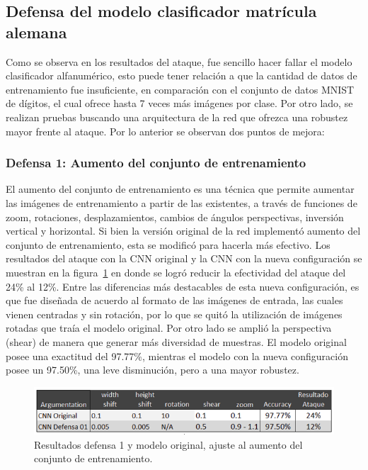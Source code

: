 \subsection{Defensa del modelo clasificador matrícula alemana}

Como se observa en los resultados del ataque, fue sencillo hacer fallar el modelo clasificador alfanumérico, esto puede tener relación a que la cantidad de datos de entrenamiento fue insuficiente, en comparación con el conjunto de datos MNIST de dígitos, el cual ofrece hasta 7 veces más imágenes por clase. Por otro lado, se realizan pruebas buscando una arquitectura de la red que ofrezca una robustez mayor frente al ataque. Por lo anterior se observan dos puntos de mejora:



\subsubsection{Defensa 1: Aumento del conjunto de entrenamiento}

El aumento del conjunto de entrenamiento es una técnica que permite aumentar las imágenes de entrenamiento a partir de las existentes, a través de funciones de zoom, rotaciones, desplazamientos, cambios de ángulos perspectivas, inversión vertical y horizontal. Si bien la versión original de la red implementó aumento del conjunto de entrenamiento, esta se modificó para hacerla más efectivo. Los resultados del ataque con la CNN original y la CNN con la nueva configuración se muestran en la figura~\ref{fig:63} en donde se logró reducir la efectividad del ataque del 24\% al 12\%. Entre las diferencias más destacables de esta nueva configuración, es que fue diseñada de acuerdo al formato de las imágenes de entrada, las cuales vienen centradas y sin rotación, por lo que se quitó la utilización de imágenes rotadas que traía el modelo original. Por otro lado se amplió la perspectiva (shear) de manera que generar más diversidad de muestras. El modelo original posee una exactitud del 97.77\%, mientras el modelo con la nueva configuración posee un 97.50\%, una leve disminución, pero a una mayor robustez.

 \begin{figure}[!h]
    \centering
    \includegraphics[scale = 0.85]{Figures/figura_63.PNG}
    \decoRule
    \caption[Resultados defensa 1]{Resultados defensa 1 y modelo original, ajuste al aumento del conjunto de entrenamiento.}
    \label{fig:63}
\end{figure}




